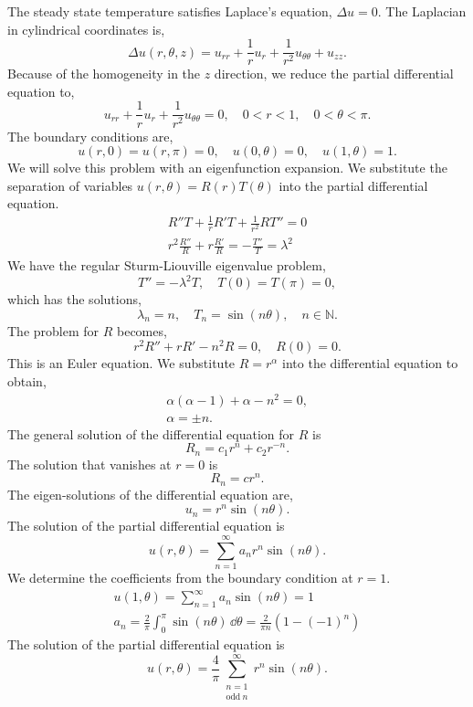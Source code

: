 {%
\begin{Solution}
  \label{solution potential semi-circular rod}
  The steady state temperature satisfies Laplace's equation, $\Delta u = 0$.
  The Laplacian in cylindrical coordinates is,
  \[
  \Delta u(r,\theta,z) = u_{r r} + \frac{1}{r} u_r + \frac{1}{r^2} 
  u_{\theta\theta} + u_{z z}.
  \]
  Because of the homogeneity in the $z$ direction, we reduce the partial 
  differential equation to,
  \[
  u_{r r} + \frac{1}{r} u_r + \frac{1}{r^2} 
  u_{\theta\theta} = 0, \quad 0 < r < 1, \quad 0 < \theta < \pi.
  \]
  The boundary conditions are,
  \[
  u(r,0) = u(r,\pi) = 0, \quad u(0,\theta) = 0, \quad u(1,\theta) = 1.
  \]
  We will solve this problem with an eigenfunction expansion.  We substitute
  the separation of variables $u(r,\theta) = R(r) T(\theta)$ into the
  partial differential equation.
  \begin{gather*}
    R'' T + \frac{1}{r} R' T + \frac{1}{r^2} R T'' = 0 \\
    r^2 \frac{R''}{R} + r \frac{R'}{R} = - \frac{T''}{T} = \lambda^2
  \end{gather*}
  We have the regular Sturm-Liouville eigenvalue problem,
  \[
  T'' = -\lambda^2 T, \quad T(0) = T(\pi) = 0,
  \]
  which has the solutions,
  \[
  \lambda_n = n, \quad
  T_n = \sin(n \theta), \quad
  n \in \mathbb{N}.
  \]
  The problem for $R$ becomes,
  \[
  r^2 R'' + r R' - n^2 R = 0, \quad R(0) = 0.
  \]
  This is an Euler equation.  We substitute $R = r^\alpha$ into the differential
  equation to obtain,
  \begin{gather*}
    \alpha (\alpha-1) + \alpha - n^2 = 0, \\
    \alpha = \pm n.
  \end{gather*}
  The general solution of the differential equation for $R$ is
  \[
  R_n = c_1 r^n + c_2 r^{-n}.
  \]
  The solution that vanishes at $r = 0$ is
  \[
  R_n = c r^n.
  \]
  The eigen-solutions of the differential equation are,
  \[
  u_n = r^n \sin(n \theta).
  \]
  The solution of the partial differential equation is
  \[
  u(r,\theta) = \sum_{n=1}^\infty a_n r^n \sin(n \theta).
  \]
  We determine the coefficients from the boundary condition at $r = 1$.
  \begin{gather*}
    u(1,\theta) = \sum_{n=1}^\infty a_n \sin(n \theta) = 1 \\
    a_n = \frac{2}{\pi} \int_0^\pi \sin(n \theta) \,\dd \theta
    = \frac{2}{\pi n} \left( 1 - (-1)^n \right)
  \end{gather*}
  The solution of the partial differential equation is
  \[
  \boxed{
    u(r,\theta) = \frac{4}{\pi} \sum_{ \substack{n = 1 \\ \mathrm{odd}\ n} }^\infty 
    r^n \sin(n \theta).
    }
  \]
\end{Solution}



}
